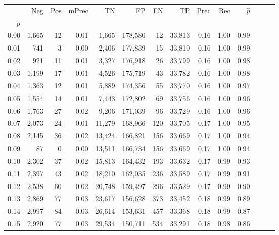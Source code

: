 \begin{tabular}{rrrrrrrrrrrrrr}
\toprule
{} &    Neg &  Pos & mPrec &       TN &       FP &      FN &      TP &  Prec &   Rec & $\hat{p}$ \\
p    &        &      &       &          &          &         &         &       &       &           \\
\midrule
0.00 &  1,665 &   12 &  0.01 &    1,665 &  178,580 &      12 &  33,813 &  0.16 &  1.00 &      0.99 \\
0.01 &    741 &    3 &  0.00 &    2,406 &  177,839 &      15 &  33,810 &  0.16 &  1.00 &      0.99 \\
0.02 &    921 &   11 &  0.01 &    3,327 &  176,918 &      26 &  33,799 &  0.16 &  1.00 &      0.98 \\
0.03 &  1,199 &   17 &  0.01 &    4,526 &  175,719 &      43 &  33,782 &  0.16 &  1.00 &      0.98 \\
0.04 &  1,363 &   12 &  0.01 &    5,889 &  174,356 &      55 &  33,770 &  0.16 &  1.00 &      0.97 \\
0.05 &  1,554 &   14 &  0.01 &    7,443 &  172,802 &      69 &  33,756 &  0.16 &  1.00 &      0.96 \\
0.06 &  1,763 &   27 &  0.02 &    9,206 &  171,039 &      96 &  33,729 &  0.16 &  1.00 &      0.96 \\
0.07 &  2,073 &   24 &  0.01 &   11,279 &  168,966 &     120 &  33,705 &  0.17 &  1.00 &      0.95 \\
0.08 &  2,145 &   36 &  0.02 &   13,424 &  166,821 &     156 &  33,669 &  0.17 &  1.00 &      0.94 \\
0.09 &     87 &    0 &  0.00 &   13,511 &  166,734 &     156 &  33,669 &  0.17 &  1.00 &      0.94 \\
0.10 &  2,302 &   37 &  0.02 &   15,813 &  164,432 &     193 &  33,632 &  0.17 &  0.99 &      0.93 \\
0.11 &  2,397 &   43 &  0.02 &   18,210 &  162,035 &     236 &  33,589 &  0.17 &  0.99 &      0.91 \\
0.12 &  2,538 &   60 &  0.02 &   20,748 &  159,497 &     296 &  33,529 &  0.17 &  0.99 &      0.90 \\
0.13 &  2,869 &   77 &  0.03 &   23,617 &  156,628 &     373 &  33,452 &  0.18 &  0.99 &      0.89 \\
0.14 &  2,997 &   84 &  0.03 &   26,614 &  153,631 &     457 &  33,368 &  0.18 &  0.99 &      0.87 \\
0.15 &  2,920 &   77 &  0.03 &   29,534 &  150,711 &     534 &  33,291 &  0.18 &  0.98 &      0.86 \\

\end{tabular}
